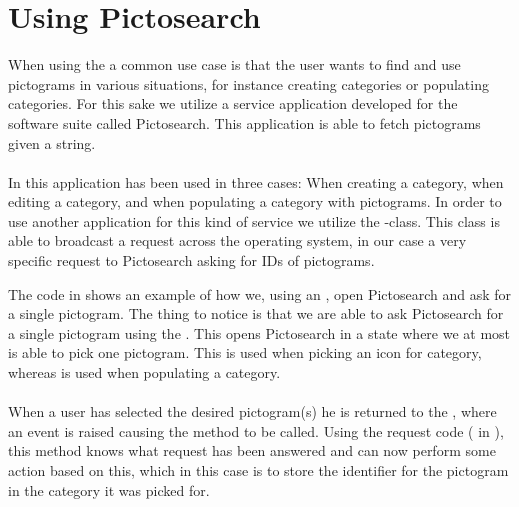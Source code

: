 
\section{Using Pictosearch}
\label{sec:using_pictosearch}


When using the \ct a common use case is that the user wants to find and use pictograms in various situations, for instance creating categories or populating categories. For this sake we utilize a service application developed for the \giraf software suite called Pictosearch. This application is able to fetch pictograms given a string. 
\\\\
In \ct this application has been used in three cases: When creating a category, when editing a category, and when populating a category with pictograms. In order to use another application for this kind of service we utilize the -class. This class is able to broadcast a request across the operating system, in our case a very specific request to Pictosearch asking for IDs of pictograms. 



The code in  shows an example of how we, using an , open Pictosearch and ask for a single pictogram. The thing to notice is that we are able to ask Pictosearch for a single pictogram using the . This opens Pictosearch in a state where we at most is able to pick one pictogram. This is used when picking an icon for category, whereas  is used when populating a category. 
\\\\
When a user has selected the desired pictogram(s) he is returned to the \ct, where an event is raised causing the method  to be called. Using the request code ( in ), this method knows what request has been answered and can now perform some action based on this, which in this case is to store the identifier for the pictogram in the category it was picked for.

